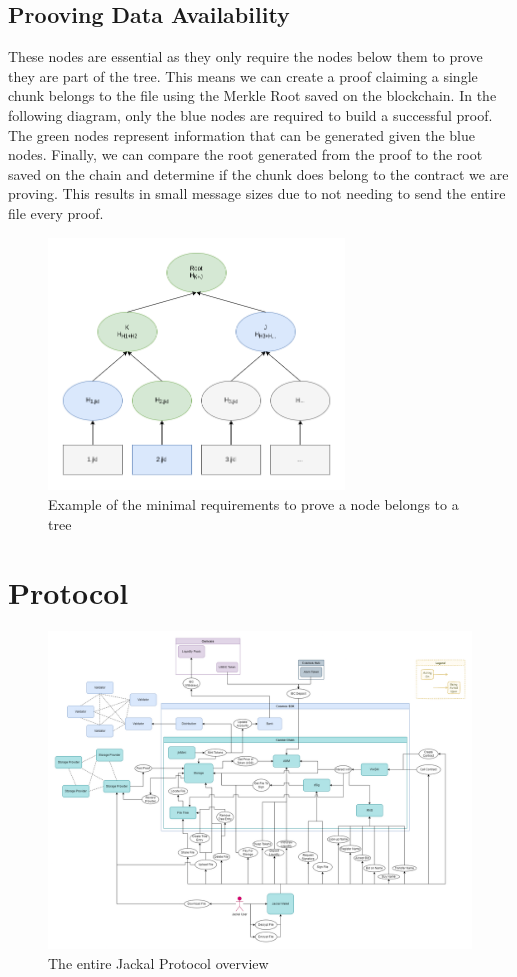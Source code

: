 \documentclass[a4paper]{article}
\begin{document}
\subsection{Prooving Data Availability}
These nodes are essential as they only require the nodes below them to prove they are part of the tree. This means we can create a proof claiming a single chunk belongs to the file using the Merkle Root saved on the blockchain. In the following diagram, only the blue nodes are required to build a successful proof. The green nodes represent information that can be generated given the blue nodes. Finally, we can compare the root generated from the proof to the root saved on the chain and determine if the chunk does belong to the contract we are proving. This results in small message sizes due to not needing to send the entire file every proof.
\begin{figure}[!htbp]
\centering
\includegraphics[width=0.7\textwidth]{assets/tree3.png}
\caption{Example of the minimal requirements to prove a node belongs to a tree}
\end{figure}

\newpage
\section{Protocol}

\begin{figure}[!htbp]
\centering
\includegraphics[width=1\textwidth]{assets/protocol.png}
\caption{The entire Jackal Protocol overview}
\end{figure}
\end{document}

